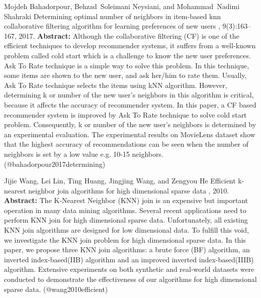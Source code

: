 \documentclass{article}
\begin{document}
\begin{thebibliography}{}
 Mojdeh Bahadorpour, Behzad~Soleimani Neysiani, and Mohammad~Nadimi Shahraki \newblock Determining optimal number of neighbors in item-based knn collaborative filtering algorithm for learning preferences of new users , 9(3):163--167, 2017. \newblock \textbf{Abstract:} Although the collaborative filtering (CF) is one of the efficient techniques to develop recommender systems, it suffers from a well-known problem called cold start which is a challenge to know the new user preferences. Ask To Rate technique is a simple way to solve this problem. In this technique, some items are shown to the new user, and ask her/him to rate them. Usually, Ask To Rate technique selects the items using kNN algorithm. However, determining k or number of the new user's neighbors in this algorithm is critical, because it affects the accuracy of recommender system. In this paper, a CF based recommender system is improved by Ask To Rate technique to solve cold start problem. Consequently, k or number of the new user's neighbors is determined by an experimental evaluation. The experimental results on MovieLens dataset show that the highest accuracy of recommendations can be seen when the number of neighbors is set by a low value e.g. 10-15 neighbors. \newblock (@bahadorpour2017determining)

 Jijie Wang, Lei Lin, Ting Huang, Jingjing Wang, and Zengyou He \newblock Efficient k-nearest neighbor join algorithms for high dimensional sparse data , 2010. \newblock \textbf{Abstract:} The K-Nearest Neighbor (KNN) join is an expensive but important operation in many data mining algorithms. Several recent applications need to perform KNN join for high dimensional sparse data. Unfortunately, all existing KNN join algorithms are designed for low dimensional data. To fulfill this void, we investigate the KNN join problem for high dimensional sparse data. In this paper, we propose three KNN join algorithms: a brute force (BF) algorithm, an inverted index-based(IIB) algorithm and an improved inverted index-based(IIIB) algorithm. Extensive experiments on both synthetic and real-world datasets were conducted to demonstrate the effectiveness of our algorithms for high dimensional sparse data. \newblock (@wang2010efficient)


\end{thebibliography}
\end{document}
